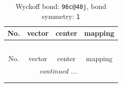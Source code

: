 \documentclass[fleqn,8pt]{jsarticle}
\begin{document}
\renewcommand{\arraystretch}{1.2}
\begin{longtable}{cccc}
\caption{Wyckoff bond: {\tt 96c@48j}, bond symmetry: {\tt 1}}
 \\
 \hline \hline
No. & vector & center & mapping \\ \hline \endfirsthead

\multicolumn{3}{l}{\tablename\ \thetable{}} \\
 \hline \hline
No. & vector & center & mapping \\ \hline \endhead

 \hline \hline
\multicolumn{3}{r}{\footnotesize\it continued ...} \\ \endfoot

 \hline \hline
\multicolumn{3}{r}{} \\ \endlastfoot


\end{longtable}
\end{document}
